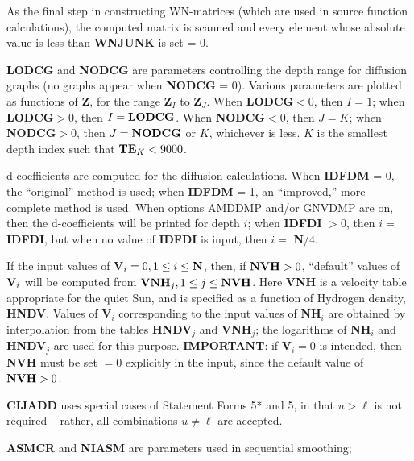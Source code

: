 \space \noindent
As the final step in constructing WN-matrices (which are used in source
function calculations), the computed matrix is scanned and every
element whose absolute value is less than {\bf WNJUNK} is set = 0.
\blankline
\blankline
\centerline{}
\space \noindent
{\bf LODCG} and {\bf NODCG} are parameters controlling the depth range
for diffusion graphs (no graphs appear when {\bf NODCG} = 0).
Various parameters are plotted as functions of {\bf Z},
for the range {\bf Z}$_I$ to {\bf Z}$_J$. \np
When {\bf LODCG}$ < 0$, then $I = 1$; when {\bf LODCG}$ > 0$, then
$I = {\bf LODCG}$. \np
When {\bf NODCG}$ < 0$, then $J = K$; when {\bf NODCG}$ > 0$, then
$J = {\bf NODCG}$ or $K$, whichever is less.
$K$ is the smallest depth index such that ${\bf TE}_K < 9000$.
\ej
\centerline{}
\space \noindent
d-coefficients are computed for the diffusion calculations. \np
When {\bf IDFDM} = 0, the ``original'' method is used; \np
when {\bf IDFDM} = 1, an ``improved,'' more complete method is used. \np
When options AMDDMP and/or GNVDMP are on, then the d-coefficients
will be printed for depth $i$; when {\bf IDFDI} $> 0$, then
$i =$ {\bf IDFDI}, but when no value of {\bf IDFDI} is input,
then $i =$ {\bf N}$/4$.
\blankline
\blankline
\centerline{}
\space \noindent
If the input values of {\bf V}$_i = 0, 1 \leq i \leq {\bf N}$, then, 
if ${\bf NVH} > 0$, ``default'' values of ${\bf V}_i$ will be
computed from ${\bf VNH}_j, 1 \leq j \leq {\bf NVH}$. Here
{\bf VNH} is a velocity table appropriate for the quiet Sun, and is
specified as a function of Hydrogen density, {\bf HNDV}. Values of
{\bf V}$_i$ corresponding to the input values of {\bf NH}$_i$ are
obtained by interpolation from the tables {\bf HNDV}$_j$ and {\bf VNH}$_j$;
the logarithms of {\bf NH}$_i$ and {\bf HNDV}$_j$ are used for this 
purpose. \np
\blankline
{\bf IMPORTANT}: if {\bf V}$_i = 0$ is intended, then {\bf NVH} must be set
$= 0$ explicitly in the input, since the default value of ${\bf NVH} > 0$.
\blankline
\blankline
\centerline{}
\space \noindent
{\bf CIJADD} uses special cases of Statement Forms 5* and 5, in that
$u > \ell$ is not required -- rather, all combinations $u \neq \ell$ are 
accepted.
\blankline
\blankline
\centerline{}
\space \noindent
{\bf ASMCR} and {\bf NIASM} are parameters used in sequential smoothing; 
